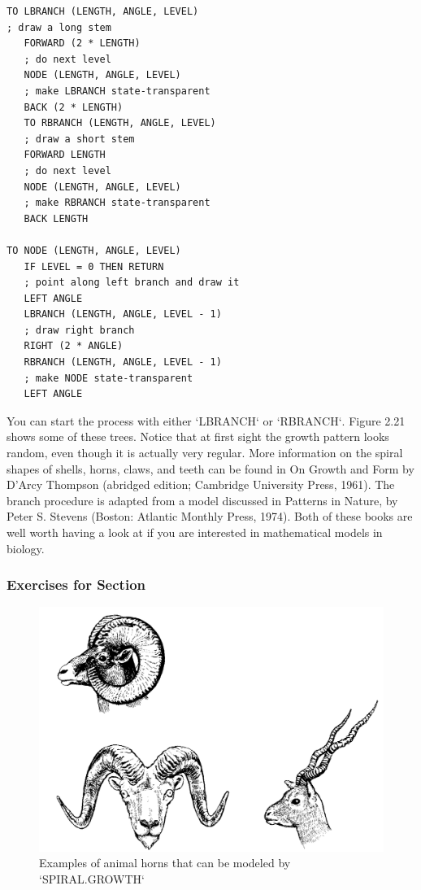 \documentclass{book}
\begin{document}
\begin{verbatim}
TO LBRANCH (LENGTH, ANGLE, LEVEL)
; draw a long stem
   FORWARD (2 * LENGTH)
   ; do next level
   NODE (LENGTH, ANGLE, LEVEL)
   ; make LBRANCH state-transparent
   BACK (2 * LENGTH)
   TO RBRANCH (LENGTH, ANGLE, LEVEL)
   ; draw a short stem
   FORWARD LENGTH
   ; do next level
   NODE (LENGTH, ANGLE, LEVEL)
   ; make RBRANCH state-transparent
   BACK LENGTH

TO NODE (LENGTH, ANGLE, LEVEL)
   IF LEVEL = 0 THEN RETURN
   ; point along left branch and draw it
   LEFT ANGLE
   LBRANCH (LENGTH, ANGLE, LEVEL - 1)
   ; draw right branch
   RIGHT (2 * ANGLE)
   RBRANCH (LENGTH, ANGLE, LEVEL - 1)
   ; make NODE state-transparent
   LEFT ANGLE
\end{verbatim}
You can start the process with either \textsc{`LBRANCH`} or \textsc{`RBRANCH`}. Figure 2.21
shows some of these trees. Notice that at first sight the growth pattern
looks random, even though it is actually very regular.
More information on the spiral shapes of shells, horns, claws, and teeth
can be found in On Growth and Form by D'Arcy Thompson (abridged
edition; Cambridge University Press, 1961). The branch procedure is
adapted from a model discussed in Patterns in Nature, by Peter S.
Stevens (Boston: Atlantic Monthly Press, 1974). Both of these books
are well worth having a look at if you are interested in mathematical
models in biology.

\subsubsection{Exercises for Section \thesection}

\begin{figure}
\begin{center}
\includegraphics[scale=1]{fig2-22}
\caption{Examples of animal horns that can be modeled by \textsc{`SPIRAL.GROWTH`}}
\end{center}
\end{figure}
\end{document}
